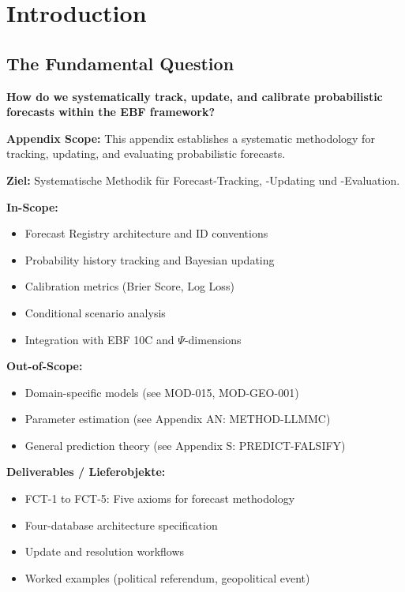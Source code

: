 \section{Introduction}
\label{sec:fct-intro}

\subsection{The Fundamental Question}

\begin{tcolorbox}[colback=yellow!10!white,colframe=yellow!50!black,title=Central Question]
\textbf{How do we systematically track, update, and calibrate probabilistic forecasts within the EBF framework?}
\end{tcolorbox}

\begin{tcolorbox}[colback=orange!5!white,colframe=orange!75!black,title=Appendix Scope]
\textbf{Appendix Scope:} This appendix establishes a systematic methodology for tracking, updating, and evaluating probabilistic forecasts.

\textbf{Ziel:} Systematische Methodik für Forecast-Tracking, -Updating und -Evaluation.

\textbf{In-Scope:}
\begin{itemize}
    \item Forecast Registry architecture and ID conventions
    \item Probability history tracking and Bayesian updating
    \item Calibration metrics (Brier Score, Log Loss)
    \item Conditional scenario analysis
    \item Integration with EBF 10C and $\Psi$-dimensions
\end{itemize}

\textbf{Out-of-Scope:}
\begin{itemize}
    \item Domain-specific models (see MOD-015, MOD-GEO-001)
    \item Parameter estimation (see Appendix AN: METHOD-LLMMC)
    \item General prediction theory (see Appendix S: PREDICT-FALSIFY)
\end{itemize}

\textbf{Deliverables / Lieferobjekte:}
\begin{itemize}
    \item FCT-1 to FCT-5: Five axioms for forecast methodology
    \item Four-database architecture specification
    \item Update and resolution workflows
    \item Worked examples (political referendum, geopolitical event)
\end{itemize}
\end{tcolorbox}

